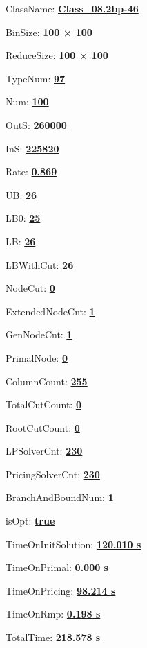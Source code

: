 \documentclass[11pt]{article}
\begin{document}
\pagestyle{empty}


ClassName: \underline{\textbf{Class_08.2bp-46}}
\par
BinSize: \underline{\textbf{100 × 100}}
\par
ReduceSize: \underline{\textbf{100 × 100}}
\par
TypeNum: \underline{\textbf{97}}
\par
Num: \underline{\textbf{100}}
\par
OutS: \underline{\textbf{260000}}
\par
InS: \underline{\textbf{225820}}
\par
Rate: \underline{\textbf{0.869}}
\par
UB: \underline{\textbf{26}}
\par
LB0: \underline{\textbf{25}}
\par
LB: \underline{\textbf{26}}
\par
LBWithCut: \underline{\textbf{26}}
\par
NodeCut: \underline{\textbf{0}}
\par
ExtendedNodeCnt: \underline{\textbf{1}}
\par
GenNodeCnt: \underline{\textbf{1}}
\par
PrimalNode: \underline{\textbf{0}}
\par
ColumnCount: \underline{\textbf{255}}
\par
TotalCutCount: \underline{\textbf{0}}
\par
RootCutCount: \underline{\textbf{0}}
\par
LPSolverCnt: \underline{\textbf{230}}
\par
PricingSolverCnt: \underline{\textbf{230}}
\par
BranchAndBoundNum: \underline{\textbf{1}}
\par
isOpt: \underline{\textbf{true}}
\par
TimeOnInitSolution: \underline{\textbf{120.010 s}}
\par
TimeOnPrimal: \underline{\textbf{0.000 s}}
\par
TimeOnPricing: \underline{\textbf{98.214 s}}
\par
TimeOnRmp: \underline{\textbf{0.198 s}}
\par
TotalTime: \underline{\textbf{218.578 s}}
\par
\newpage


\end{document}
